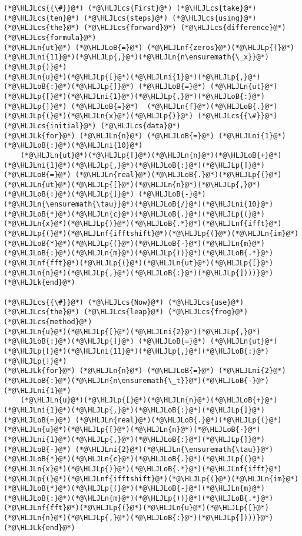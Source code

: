 \documentclass[12pt,landscape]{article}
\newcommand{\HLJLk}[1]{\textcolor[RGB]{148,91,176}{\textbf{#1}}}
\newcommand{\HLJLn}[1]{#1}
\newcommand{\HLJLnf}[1]{\textcolor[RGB]{66,102,213}{#1}}
\newcommand{\HLJLni}[1]{\textcolor[RGB]{59,151,46}{#1}}
\newcommand{\HLJLoB}[1]{\textcolor[RGB]{102,102,102}{\textbf{#1}}}
\newcommand{\HLJLp}[1]{#1}
\newcommand{\HLJLcs}[1]{\textcolor[RGB]{153,153,119}{\textit{#1}}}
\begin{document}
{\begin{lstlisting}
(*@\HLJLcs{{\#}}@*) (*@\HLJLcs{First}@*) (*@\HLJLcs{take}@*) (*@\HLJLcs{ten}@*) (*@\HLJLcs{steps}@*) (*@\HLJLcs{using}@*) (*@\HLJLcs{the}@*) (*@\HLJLcs{forward}@*) (*@\HLJLcs{difference}@*) (*@\HLJLcs{formula}@*)
(*@\HLJLn{ut}@*) (*@\HLJLoB{=}@*) (*@\HLJLnf{zeros}@*)(*@\HLJLp{(}@*)(*@\HLJLni{11}@*)(*@\HLJLp{,}@*)(*@\HLJLn{n\ensuremath{\_x}}@*)(*@\HLJLp{)}@*)
(*@\HLJLn{u}@*)(*@\HLJLp{[}@*)(*@\HLJLni{1}@*)(*@\HLJLp{,}@*)(*@\HLJLoB{:}@*)(*@\HLJLp{]}@*) (*@\HLJLoB{=}@*) (*@\HLJLn{ut}@*)(*@\HLJLp{[}@*)(*@\HLJLni{1}@*)(*@\HLJLp{,}@*)(*@\HLJLoB{:}@*)(*@\HLJLp{]}@*) (*@\HLJLoB{=}@*)  (*@\HLJLn{f}@*)(*@\HLJLoB{.}@*)(*@\HLJLp{(}@*)(*@\HLJLn{x}@*)(*@\HLJLp{)}@*) (*@\HLJLcs{{\#}}@*) (*@\HLJLcs{initial}@*) (*@\HLJLcs{data}@*)
(*@\HLJLk{for}@*) (*@\HLJLn{n}@*) (*@\HLJLoB{=}@*) (*@\HLJLni{1}@*)(*@\HLJLoB{:}@*)(*@\HLJLni{10}@*)
    (*@\HLJLn{ut}@*)(*@\HLJLp{[}@*)(*@\HLJLn{n}@*)(*@\HLJLoB{+}@*)(*@\HLJLni{1}@*)(*@\HLJLp{,}@*)(*@\HLJLoB{:}@*)(*@\HLJLp{]}@*) (*@\HLJLoB{=}@*) (*@\HLJLn{real}@*)(*@\HLJLoB{.}@*)(*@\HLJLp{(}@*)(*@\HLJLn{ut}@*)(*@\HLJLp{[}@*)(*@\HLJLn{n}@*)(*@\HLJLp{,}@*)(*@\HLJLoB{:}@*)(*@\HLJLp{]}@*) (*@\HLJLoB{-}@*) (*@\HLJLn{\ensuremath{\tau}}@*)(*@\HLJLoB{/}@*)(*@\HLJLni{10}@*)(*@\HLJLoB{*}@*)(*@\HLJLn{c}@*)(*@\HLJLoB{.}@*)(*@\HLJLp{(}@*)(*@\HLJLn{x}@*)(*@\HLJLp{)}@*)(*@\HLJLoB{.*}@*)(*@\HLJLnf{ifft}@*)(*@\HLJLp{(}@*)(*@\HLJLnf{ifftshift}@*)(*@\HLJLp{(}@*)(*@\HLJLn{im}@*)(*@\HLJLoB{*}@*)(*@\HLJLp{(}@*)(*@\HLJLoB{-}@*)(*@\HLJLn{m}@*)(*@\HLJLoB{:}@*)(*@\HLJLn{m}@*)(*@\HLJLp{))}@*)(*@\HLJLoB{.*}@*)(*@\HLJLnf{fft}@*)(*@\HLJLp{(}@*)(*@\HLJLn{ut}@*)(*@\HLJLp{[}@*)(*@\HLJLn{n}@*)(*@\HLJLp{,}@*)(*@\HLJLoB{:}@*)(*@\HLJLp{])))}@*)
(*@\HLJLk{end}@*)

(*@\HLJLcs{{\#}}@*) (*@\HLJLcs{Now}@*) (*@\HLJLcs{use}@*) (*@\HLJLcs{the}@*) (*@\HLJLcs{leap}@*) (*@\HLJLcs{frog}@*) (*@\HLJLcs{method}@*)
(*@\HLJLn{u}@*)(*@\HLJLp{[}@*)(*@\HLJLni{2}@*)(*@\HLJLp{,}@*)(*@\HLJLoB{:}@*)(*@\HLJLp{]}@*) (*@\HLJLoB{=}@*) (*@\HLJLn{ut}@*)(*@\HLJLp{[}@*)(*@\HLJLni{11}@*)(*@\HLJLp{,}@*)(*@\HLJLoB{:}@*)(*@\HLJLp{]}@*)
(*@\HLJLk{for}@*) (*@\HLJLn{n}@*) (*@\HLJLoB{=}@*) (*@\HLJLni{2}@*)(*@\HLJLoB{:}@*)(*@\HLJLn{n\ensuremath{\_t}}@*)(*@\HLJLoB{-}@*)(*@\HLJLni{1}@*)
    (*@\HLJLn{u}@*)(*@\HLJLp{[}@*)(*@\HLJLn{n}@*)(*@\HLJLoB{+}@*)(*@\HLJLni{1}@*)(*@\HLJLp{,}@*)(*@\HLJLoB{:}@*)(*@\HLJLp{]}@*) (*@\HLJLoB{=}@*) (*@\HLJLn{real}@*)(*@\HLJLoB{.}@*)(*@\HLJLp{(}@*)(*@\HLJLn{u}@*)(*@\HLJLp{[}@*)(*@\HLJLn{n}@*)(*@\HLJLoB{-}@*)(*@\HLJLni{1}@*)(*@\HLJLp{,}@*)(*@\HLJLoB{:}@*)(*@\HLJLp{]}@*) (*@\HLJLoB{-}@*) (*@\HLJLni{2}@*)(*@\HLJLn{\ensuremath{\tau}}@*)(*@\HLJLoB{*}@*)(*@\HLJLn{c}@*)(*@\HLJLoB{.}@*)(*@\HLJLp{(}@*)(*@\HLJLn{x}@*)(*@\HLJLp{)}@*)(*@\HLJLoB{.*}@*)(*@\HLJLnf{ifft}@*)(*@\HLJLp{(}@*)(*@\HLJLnf{ifftshift}@*)(*@\HLJLp{(}@*)(*@\HLJLn{im}@*)(*@\HLJLoB{*}@*)(*@\HLJLp{(}@*)(*@\HLJLoB{-}@*)(*@\HLJLn{m}@*)(*@\HLJLoB{:}@*)(*@\HLJLn{m}@*)(*@\HLJLp{))}@*)(*@\HLJLoB{.*}@*)(*@\HLJLnf{fft}@*)(*@\HLJLp{(}@*)(*@\HLJLn{u}@*)(*@\HLJLp{[}@*)(*@\HLJLn{n}@*)(*@\HLJLp{,}@*)(*@\HLJLoB{:}@*)(*@\HLJLp{])))}@*)
(*@\HLJLk{end}@*)
\end{lstlisting}


}
\end{document}
